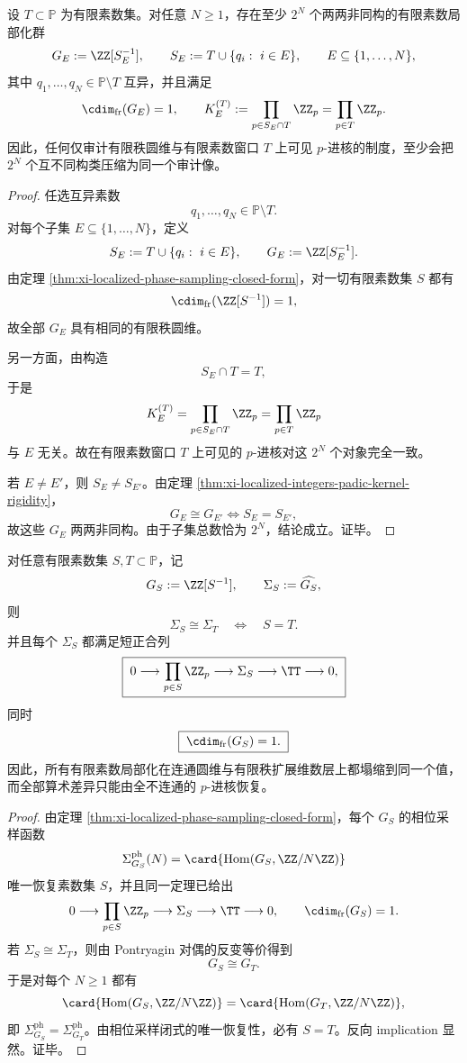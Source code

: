 \begin{theorem}\label{thm:xi-localized-finite-prime-audit-exponential-incompleteness}
设 \(T\subset\mathbb P\) 为有限素数集。对任意 \(N\ge 1\)，存在至少 \(2^N\) 个两两非同构的有限素数局部化群
\[
G_E:=\ZZ[S_E^{-1}],
\qquad
S_E:=T\cup\{q_i:\ i\in E\},
\qquad
E\subseteq\{1,\dots,N\},
\]
其中 \(q_1,\dots,q_N\in\mathbb P\setminus T\) 互异，并且满足
\[
\cdim_{\mathrm{fr}}(G_E)=1,
\qquad
K_E^{(T)}:=\prod_{p\in S_E\cap T}\ZZ_p=\prod_{p\in T}\ZZ_p.
\]
因此，任何仅审计有限秩圆维与有限素数窗口 \(T\) 上可见 \(p\)-进核的制度，至少会把 \(2^N\) 个互不同构类压缩为同一个审计像。
\end{theorem}
\begin{proof}
任选互异素数
\[
q_1,\dots,q_N\in\mathbb P\setminus T.
\]
对每个子集 \(E\subseteq\{1,\dots,N\}\)，定义
\[
S_E:=T\cup\{q_i:\ i\in E\},
\qquad
G_E:=\ZZ[S_E^{-1}].
\]
由定理 \ref{thm:xi-localized-phase-sampling-closed-form}，对一切有限素数集 \(S\) 都有
\[
\cdim_{\mathrm{fr}}(\ZZ[S^{-1}])=1,
\]
故全部 \(G_E\) 具有相同的有限秩圆维。

另一方面，由构造
\[
S_E\cap T=T,
\]
于是
\[
K_E^{(T)}=\prod_{p\in S_E\cap T}\ZZ_p=\prod_{p\in T}\ZZ_p
\]
与 \(E\) 无关。故在有限素数窗口 \(T\) 上可见的 \(p\)-进核对这 \(2^N\) 个对象完全一致。

若 \(E\neq E'\)，则 \(S_E\neq S_{E'}\)。由定理 \ref{thm:xi-localized-integers-padic-kernel-rigidity}，
\[
G_E\cong G_{E'}
\iff
S_E=S_{E'},
\]
故这些 \(G_E\) 两两非同构。由于子集总数恰为 \(2^N\)，结论成立。证毕。
\end{proof}

\begin{theorem}[局部化对偶的同构刚性]\label{thm:xi-time-part56-localized-pontryagin-isomorphism-rigidity}
对任意有限素数集 \(S,T\subset \mathbb P\)，记
\[
G_S:=\ZZ[S^{-1}],
\qquad
\Sigma_S:=\widehat{G_S},
\]
则
\[
\boxed{\;
\Sigma_S\cong \Sigma_T
\quad\Longleftrightarrow\quad
S=T.\;}
\]
并且每个 \(\Sigma_S\) 都满足短正合列
\[
\boxed{\;
0\longrightarrow \prod_{p\in S}\ZZ_p
\longrightarrow \Sigma_S
\longrightarrow \TT
\longrightarrow 0,\;}
\]
同时
\[
\boxed{\;
\cdim_{\mathrm{fr}}(G_S)=1.\;}
\]
因此，所有有限素数局部化在连通圆维与有限秩扩展维数层上都塌缩到同一个值，而全部算术差异只能由全不连通的 \(p\)-进核恢复。
\end{theorem}
\begin{proof}
由定理 \ref{thm:xi-localized-phase-sampling-closed-form}，每个 \(G_S\) 的相位采样函数
\[
\Sigma^{\mathrm{ph}}_{G_S}(N)=\card{\operatorname{Hom}(G_S,\ZZ/N\ZZ)}
\]
唯一恢复素数集 \(S\)，并且同一定理已给出
\[
0\longrightarrow \prod_{p\in S}\ZZ_p
\longrightarrow \Sigma_S
\longrightarrow \TT
\longrightarrow 0,
\qquad
\cdim_{\mathrm{fr}}(G_S)=1.
\]
若 \(\Sigma_S\cong \Sigma_T\)，则由 Pontryagin 对偶的反变等价得到
\[
G_S\cong G_T.
\]
于是对每个 \(N\ge 1\) 都有
\[
\card{\operatorname{Hom}(G_S,\ZZ/N\ZZ)}
=
\card{\operatorname{Hom}(G_T,\ZZ/N\ZZ)},
\]
即 \(\Sigma^{\mathrm{ph}}_{G_S}=\Sigma^{\mathrm{ph}}_{G_T}\)。由相位采样闭式的唯一恢复性，必有 \(S=T\)。反向 implication 显然。证毕。
\end{proof}

